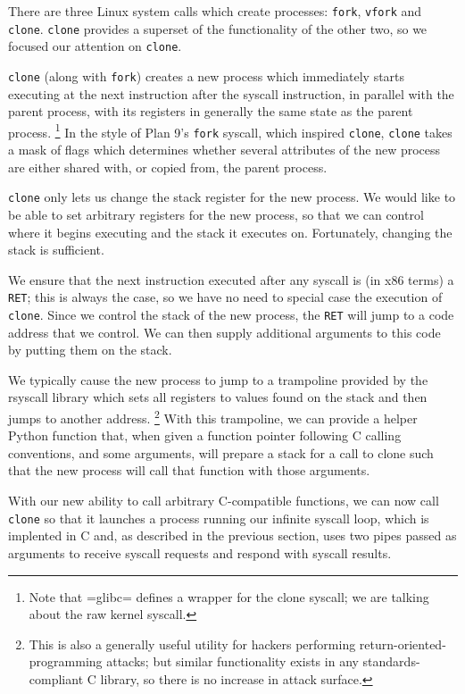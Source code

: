 \documentclass{acmart}
\begin{document}
There are three Linux system calls which create processes:
\texttt{fork}, \texttt{vfork} and \texttt{clone}.
\texttt{clone} provides a superset of the functionality of the other two,
so we focused our attention on \texttt{clone}.

\texttt{clone} (along with \texttt{fork}) creates a new process
which immediately starts executing at the next instruction after the syscall instruction,
in parallel with the parent process,
with its registers in generally the same state as the parent process.
\footnote{Note that =glibc= defines a wrapper for the clone syscall;
we are talking about the raw kernel syscall.}
In the style of Plan 9's \texttt{fork} syscall\cite{rfork}, which inspired \texttt{clone},
\texttt{clone} takes a mask of flags which determines whether several attributes of the new process
are either shared with, or copied from, the parent process.

\texttt{clone} only lets us change the stack register for the new process.
We would like to be able to set arbitrary registers for the new process,
so that we can control where it begins executing and the stack it executes on.
Fortunately, changing the stack is sufficient.

We ensure that the next instruction executed after any syscall
is (in x86 terms) a \texttt{RET};
this is always the case, so we have no need to special case the execution of \texttt{clone}.
Since we control the stack of the new process,
the \texttt{RET} will jump to a code address that we control.
We can then supply additional arguments to this code
by putting them on the stack.

We typically cause the new process to jump to a trampoline provided by the rsyscall library
which sets all registers to values found on the stack
and then jumps to another address.
\footnote{This is also a generally useful utility for hackers performing return-oriented-programming attacks;
but similar functionality exists in any standards-compliant C library,
so there is no increase in attack surface.}
With this trampoline,
we can provide a helper Python function that,
when given a function pointer following C calling conventions, and some arguments,
will prepare a stack for a call to clone such that the new process will call that function with those arguments.

With our new ability to call arbitrary C-compatible functions,
we can now call \texttt{clone} so that it launches a process running our infinite syscall loop,
which is implented in C and, as described in the previous section,
uses two pipes passed as arguments to receive syscall requests and respond with syscall results.
\end{document}
